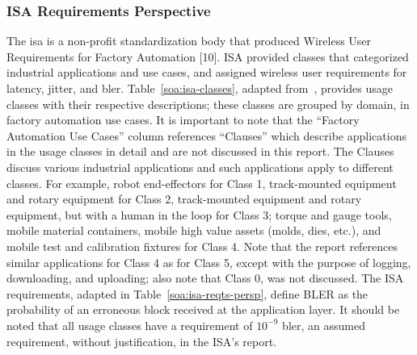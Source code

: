 \subsubsection{ISA Requirements Perspective}\label{sec:litreview:isa}

The \gls{isa} is a non-profit standardization body that produced Wireless User Requirements for Factory Automation [10]. ISA provided classes that categorized industrial applications and use cases, and assigned wireless user requirements for latency, jitter, and \gls{bler}. Table~\ref{soa:isa-classes}, adapted from~\cite{ISATR100-2011}, provides usage classes with their respective descriptions; these classes are grouped by domain, in factory automation use cases. It is important to note that the “Factory Automation Use Cases” column references “Clauses” which describe applications in the usage classes in detail and are not discussed in this report. The Clauses discuss various industrial applications and such applications apply to different classes. For example, robot end-effectors for Class 1, track-mounted equipment and rotary equipment for Class 2, track-mounted equipment and rotary equipment, but with a human in the loop for Class 3; torque and gauge tools, mobile material containers, mobile high value assets (molds, dies, etc.), and mobile test and calibration fixtures for Class 4. Note that the report references similar applications for Class 4 as for Class 5, except with the purpose of logging, downloading, and uploading; also note that Class 0, was not discussed. The ISA requirements, adapted in Table~\ref{soa:isa-reqts-persp}, define BLER as the probability of an erroneous block received at the application layer. It should be noted that all usage classes have a requirement of $10^{-9}$ \gls{bler}, an assumed requirement, without justification, in the ISA’s report. 

